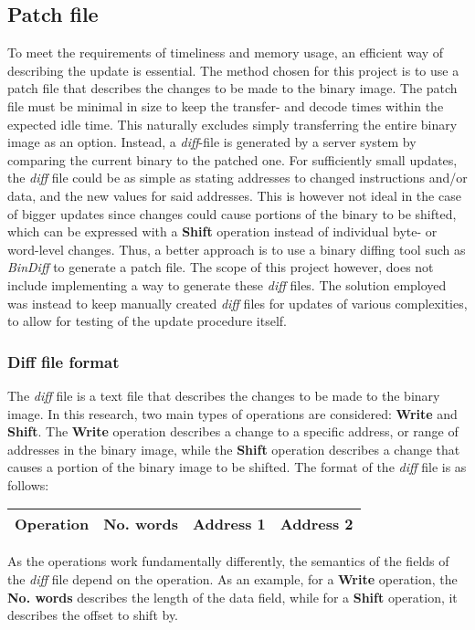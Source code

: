 
\subsection{Patch file}\label{sec:patchfile}
To meet the requirements of timeliness and memory usage, an efficient way of describing the update is essential. The method chosen for this project is to use a patch file that describes the changes to be made to the binary image.
The patch file must be minimal in size to keep the transfer- and decode times within the expected idle time. This naturally excludes simply transferring the entire binary image as an option. Instead, a \textit{\textit{diff}}-file is generated by a server system by comparing the current binary to the patched one. For sufficiently small updates, the \textit{diff} file could be as simple as stating addresses to changed instructions and/or data, and the new values for said addresses. This is however not ideal in the case of bigger updates since changes could cause portions of the binary to be shifted, which can be expressed with a \textbf{Shift} operation instead of individual byte- or word-level changes. Thus, a better approach is to use a binary diffing tool such as \textit{BinDiff} to generate a patch file. The scope of this project however, does not include implementing a way to generate these \textit{diff} files. The solution employed was instead to keep manually created \textit{diff} files for updates of various complexities, to allow for testing of the update procedure itself. 

\subsubsection*{Diff file format}
The \textit{diff} file is a text file that describes the changes to be made to the binary image. In this research, two main types of operations are considered: \textbf{Write} and \textbf{Shift}. The \textbf{Write} operation describes a change to a specific address, or range of addresses in the binary image, while the \textbf{Shift} operation describes a change that causes a portion of the binary image to be shifted. The format of the \textit{diff} file is as follows:

\begin{center}
\begin{tabular}{|c|c|c|c|}
\hline
\textbf{Operation} & \textbf{No. words} & \textbf{Address 1}  & \textbf{Address 2} \\
\hline
\end{tabular}
\end{center}
As the operations work fundamentally differently, the semantics of the fields of the \textit{diff} file depend on the operation. As an example, for a \textbf{Write} operation, the \textbf{No. words} describes the length of the data field, while for a \textbf{Shift} operation, it describes the offset to shift by.

